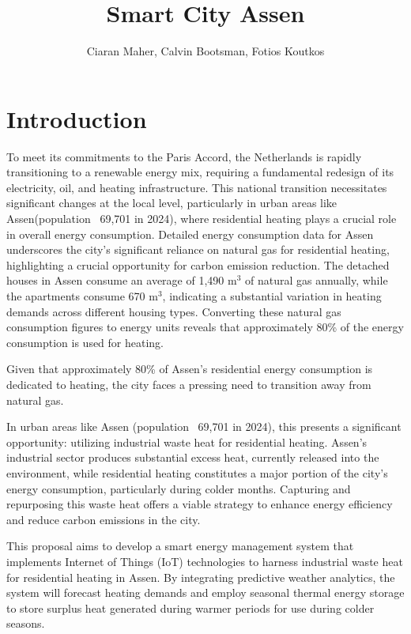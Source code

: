 \documentclass{article}
\title{Smart City Assen}
\author{Ciaran Maher, Calvin Bootsman, Fotios Koutkos}
\begin{document}
\maketitle
\section{Introduction}
To meet its commitments to the Paris Accord, the Netherlands is rapidly transitioning to a renewable energy mix, requiring a fundamental redesign of its electricity, oil, and heating infrastructure\cite{paris_agreement}. This national transition necessitates significant changes at the local level, particularly in urban areas like Assen(population ~69,701 in 2024\cite{allecijfers}), where residential heating plays a crucial role in overall energy consumption. Detailed energy consumption data for Assen underscores the city's significant reliance on natural gas for residential heating, highlighting a crucial opportunity for carbon emission reduction. The detached houses in Assen consume an average of 1,490 m$^3$ of natural gas annually, while the apartments consume 670 m$^3$\cite{assen_woningen}, indicating a substantial variation in heating demands across different housing types. Converting these natural gas consumption figures to energy units reveals that approximately 80\% of the energy consumption is used for heating.

Given that approximately 80\% of Assen's residential energy consumption is dedicated to heating, the city faces a pressing need to transition away from natural gas. 

In urban areas like Assen (population ~69,701 in 2024\cite{allecijfers}), this presents a significant opportunity: utilizing industrial waste heat for residential heating. Assen's industrial sector produces substantial excess heat, currently released into the environment, while residential heating constitutes a major portion of the city's energy consumption, particularly during colder months. Capturing and repurposing this waste heat offers a viable strategy to enhance energy efficiency and reduce carbon emissions in the city\cite{allecijfers}. 

This proposal aims to develop a smart energy management system that implements Internet of Things (IoT) technologies to harness industrial waste heat for residential heating in Assen. By integrating predictive weather analytics, the system will forecast heating demands and employ seasonal thermal energy storage to store surplus heat generated during warmer periods for use during colder seasons.
\end{document}

